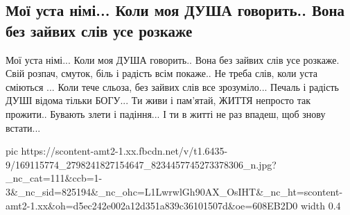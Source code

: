  
 
 
 
 

\subsection{Мої уста німі... Коли моя ДУША говорить.. Вона без зайвих слів усе розкаже}
\label{sec:05_04_2021.fb.popovich_vlad.1.ukraina_moskovia}

Мої уста німі... 
Коли моя ДУША говорить..
Вона без зайвих слів 
усе  розкаже.
Свій розпач, смуток, 
біль і радість всім покаже..
Не треба слів, 
коли уста сміються ...
Коли тече сльоза,
без зайвих слів все зрозуміло...
Печаль і радість ДУШІ
відома тільки БОГУ...
Ти живи і пам'ятай,
ЖИТТЯ непросто так прожити..
Бувають злети і падіння...
І ти в житті не раз впадеш,
щоб знову встати...

\ifcmt
  pic https://scontent-amt2-1.xx.fbcdn.net/v/t1.6435-9/169115774_2798241827154647_8234457745273378306_n.jpg?_nc_cat=111&ccb=1-3&_nc_sid=825194&_nc_ohc=L1LwrwlGh90AX_OsIHT&_nc_ht=scontent-amt2-1.xx&oh=d5ec242e002a12d351a839c36101507d&oe=608EB2D0
  width 0.4
\fi

